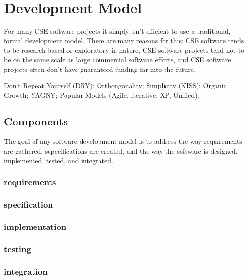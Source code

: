 \documentclass[12pt,relax]{article}
\begin{document}
\section{Development Model}
\label{Section:Development Model}

For many CSE software projects it simply isn't efficient to use a traditional, 
formal development model.  There are many reasons for this:  CSE software tends
to be research-based or exploratory in nature, CSE software projects tend not
to be on the same scale as large commercial software efforts, and CSE software 
projects often don't have guaranteed funding far into the future.

Don't Repeat Yourself (DRY);
Orthongonality;
Simplicity (KISS);
Organic Growth;
YAGNY;
Popular Models (Agile, Iterative, XP, Unified);

\subsection{Components}
  
  The goal of any software development model is to address the way requirements
  are gathered, sepecifications are created, and the way the software is
  designed, implemented, tested, and integrated.
  
  \subsubsection{requirements}
  
  \subsubsection{specification}
  
  \subsubsection{implementation}
  
  \subsubsection{testing}
  
  \subsubsection{integration}
  
\end{document}
